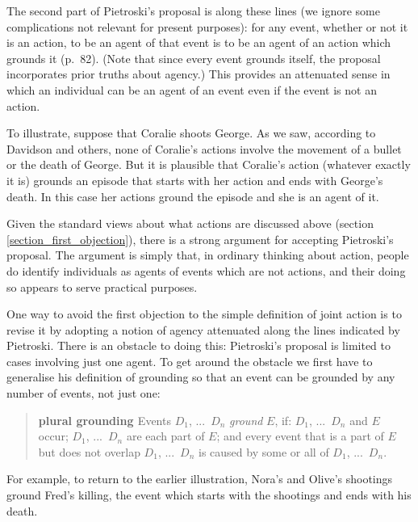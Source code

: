 \documentclass[12pt,a4paper]{extarticle}
\begin{document}
The second part of Pietroski's proposal is along these lines (we ignore some complications not relevant for present purposes): for any event, whether or not it is an action, to be an agent of that event is to be an agent of an action which grounds it (p.\ 82).
(Note that since every event grounds itself, the proposal incorporates prior truths about agency.)
This provides an attenuated sense in which an individual can be an agent of an event even if the event is not an action.

To illustrate, suppose that Coralie shoots George.
As we saw, according to Davidson and others, none of Coralie's actions involve the movement of a bullet or the death of George.
But it is plausible that Coralie's action (whatever exactly it is)  grounds an episode that starts with her action and ends with George's death.
In this case her actions ground the episode and she is an agent of it. 

Given the standard views about what actions are discussed above (section \vref{section_first_objection}), there is a strong argument for accepting Pietroski's proposal.
The argument is simply that, in ordinary thinking about action, people do identify individuals as agents of events which are not actions, and their doing so appears to serve practical purposes.

One way to avoid the first objection to the simple definition of joint action is to revise it by adopting a notion of agency attenuated along the lines indicated by Pietroski.
There is an obstacle to doing this: Pietroski's proposal is limited to cases involving just one agent.
To get around the obstacle we first have to generalise his definition of grounding so that an event can be grounded by any number of events, not just one:
%
\begin{quote}
\textbf{plural grounding
	\label{df_plural_grounding}	
}
Events $D_1$, ...\ $D_n$ \emph{ground} $E$, if: $D_1$, ...\ $D_n$ and $E$ occur; 
$D_1$, ...\ $D_n$ are each part of $E$; and 
every event that is 
	a part of $E$
	but does not overlap $D_1$, ...\ $D_n$ 
is caused by some or all of $D_1$, ...\ $D_n$.
\end{quote}
%
For example, to return to the earlier illustration, Nora's and Olive's shootings ground Fred's killing, the event which starts with the shootings and ends with his death.
\end{document}
